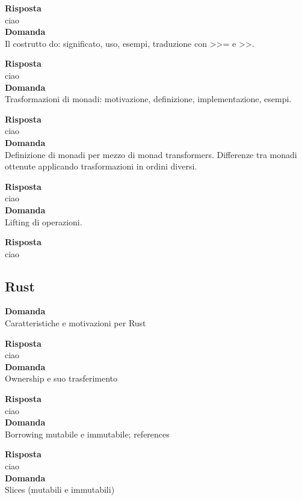 \documentclass{article}
\begin{document}
\textbf{Risposta}\\
ciao
\vspace{14pt}\\
\textbf{Domanda}\\
Il costrutto do: significato, uso, esempi, traduzione con >>= e >>.

\textbf{Risposta}\\
ciao
\vspace{14pt}\\
\textbf{Domanda}\\
Trasformazioni di monadi: motivazione, definizione, implementazione, esempi.

\textbf{Risposta}\\
ciao
\vspace{14pt}\\
\textbf{Domanda}\\
Definizione di monadi per mezzo di monad transformers. Differenze tra monadi ottenute applicando trasformazioni in ordini diversi.

\textbf{Risposta}\\
ciao
\vspace{14pt}\\
\textbf{Domanda}\\
Lifting di operazioni.

\textbf{Risposta}\\
ciao
\vspace{14pt}\\

\subsection*{Rust}
\textbf{Domanda}\\
Caratteristiche e motivazioni per Rust

\textbf{Risposta}\\
ciao
\vspace{14pt}\\
\textbf{Domanda}\\
Ownership e suo trasferimento

\textbf{Risposta}\\
ciao
\vspace{14pt}\\
\textbf{Domanda}\\
Borrowing mutabile e immutabile; references

\textbf{Risposta}\\
ciao
\vspace{14pt}\\
\textbf{Domanda}\\
Slices (mutabili e immutabili)
\end{document}
